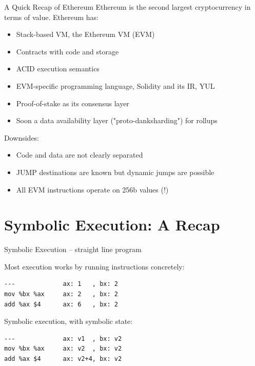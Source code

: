 \documentclass[aspectratio=169]{beamer}
\begin{document}
\begin{frame}{A Quick Recap of Ethereum}
Ethereum is the second largest cryptocurrency in terms of value. Ethereum has:
\begin{itemize}
\item Stack-based VM, the Ethereum VM (EVM)
\item Contracts with code and storage
\item ACID execution semantics
\item EVM-specific programming language, Solidity and its IR, YUL
\item Proof-of-stake as its consensus layer
\item Soon a data availability layer ("proto-danksharding") for rollups
\end{itemize}

Downsides:
\begin{itemize}
\item Code and data are not clearly separated
\item JUMP destinations are known but dynamic jumps are possible
\item All EVM instructions operate on 256b values (!)
\end{itemize}

\end{frame}


\section{Symbolic Execution: A Recap}
\begin{frame}[fragile=singleslide]{Symbolic Execution -- straight line program}

Most execution works by running instructions concretely:
\begin{verbatim}
---             ax: 1   , bx: 2
mov %bx %ax     ax: 2   , bx: 2
add %ax $4      ax: 6   , bx: 2
\end{verbatim}
\bigskip

Symbolic execution, with symbolic state:
\begin{verbatim}
---             ax: v1  , bx: v2
mov %bx %ax     ax: v2  , bx: v2
add %ax $4      ax: v2+4, bx: v2
\end{verbatim}
\end{frame}
\end{document}
